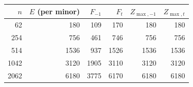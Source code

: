\begin{tabular}{rrrrrr}
\toprule
$n$ & $E$ (per minor) & $F_{-1}$ & $F_t$ & $Z_{\max,-1}$ & $Z_{\max,t}$ \\
\midrule
62 & 180 & 109 & 170 & 180 & 180 \\
254 & 756 & 461 & 746 & 756 & 756 \\
514 & 1536 & 937 & 1526 & 1536 & 1536 \\
1042 & 3120 & 1905 & 3110 & 3120 & 3120 \\
2062 & 6180 & 3775 & 6170 & 6180 & 6180 \\
\bottomrule
\end{tabular}
